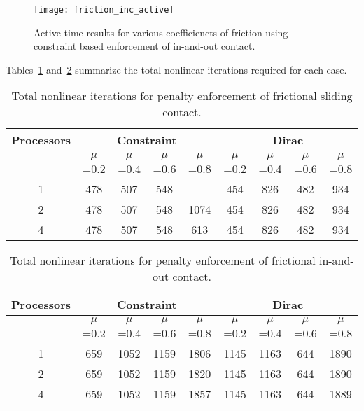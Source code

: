 \documentclass[]{article}
\begin{document}
\begin{figure}[H]
   \centering
   \texttt{[image: friction\_inc\_active]}
   \caption{Active time results for various coefficiencts of friction using constraint based enforcement of in-and-out contact.}
   \label{fig:friction_inc_active}
\end{figure}

\noindent Tables~\ref{table:sliding_nonlinear} and~\ref{table:inandout_nonlinear} summarize the total nonlinear iterations required for each case.

\begin{table}[H]
\centering
\caption{Total nonlinear iterations for penalty enforcement of frictional sliding contact.}
\begin{tabular}{*9c}
\toprule
Processors &  \multicolumn{4}{c}{Constraint} & \multicolumn{4}{c}{Dirac}\\
\midrule
{}   & $\mu$=0.2   & $\mu$=0.4     & $\mu$=0.6    & $\mu$=0.8 & $\mu$=0.2 & $\mu$=0.4 & $\mu$=0.6 & $\mu$=0.8 \\
1   &  478 & 507   & 548  &          & 454 & 826 & 482 & 934\\
2   &  478 & 507   & 548  & 1074 & 454 & 826 & 482 & 934\\
4   &  478 & 507   & 548  & 613   & 454 & 826 & 482 & 934\\
\bottomrule
\end{tabular}
\label{table:sliding_nonlinear}
\end{table}


\begin{table}[H]
\centering
\caption{Total nonlinear iterations for penalty enforcement of frictional in-and-out contact.}
\begin{tabular}{*9c}
\toprule
Processors &  \multicolumn{4}{c}{Constraint} & \multicolumn{4}{c}{Dirac}\\
\midrule
{}   & $\mu$=0.2   & $\mu$=0.4     & $\mu$=0.6    & $\mu$=0.8 & $\mu$=0.2 & $\mu$=0.4 & $\mu$=0.6 & $\mu$=0.8 \\
1   &  659 & 1052   & 1159  & 1806   & 1145 & 1163 & 644 & 1890\\
2   &  659 & 1052   & 1159  & 1820   & 1145 & 1163 & 644 & 1890\\
4   &  659 & 1052   & 1159  & 1857   & 1145 & 1163 & 644 & 1889\\
\bottomrule
\end{tabular}
\label{table:inandout_nonlinear}
\end{table}
\end{document}

